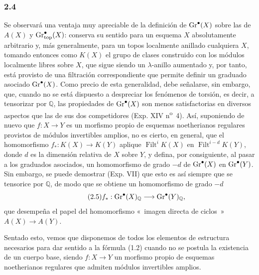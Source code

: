 \subsubsection*{2.4}
Se observará una ventaja muy apreciable de la definición de
$\operatorname{Gr}^\bullet(X)$ sobre las de $A(X)$ y
$\operatorname{Gr}^{\bullet}_{\mathrm{top}}(X)$: conserva su sentido para un esquema $X$
absolutamente arbitrario y, más generalmente, para un topos localmente
anillado cualquiera $X$, tomando entonces como $K(X)$ el grupo de clases
construido con los módulos localmente libres sobre $X$, que sigue siendo un
$\lambda$-anillo aumentado y, por tanto, está provisto de una filtración
correspondiente que permite definir un graduado asociado $\operatorname{Gr}^\bullet(X)$.
Como precio de esta generalidad, debe señalarse, sin embargo, que, cuando no
se está dispuesto a despreciar los fenómenos de torsión, es decir, a
tensorizar por $\mathbb Q$, las propiedades de $\operatorname{Gr}^\bullet(X)$ son menos
satisfactorias en diversos aspectos que las de sus dos competidores (Exp.
XIV n\textsuperscript{o}~4). Así, suponiendo de nuevo que $f:X\to Y$ es un
morfismo propio de esquemas noetherianos regulares provistos de módulos
invertibles amplios, no es cierto, en general, que el homomorfismo
$f_*:K(X)\longrightarrow K(Y)$ aplique $\operatorname{Filt}^i K(X)$ en
$\operatorname{Filt}^{i-d} K(Y)$, donde $d$ es la dimensión relativa de $X$
sobre $Y$, y defina, por consiguiente, al pasar a los graduados asociados, un
homomorfismo de grado $-d$ de $\operatorname{Gr}^\bullet(X)$ en $\operatorname{Gr}^\bullet(Y)$. Sin
embargo, se puede demostrar (Exp. VII) que esto es así siempre que se
tensorice por $\mathbb Q$, de modo que se obtiene un homomorfismo de grado
$-d$
\begin{equation}\tag{2.5}
f_*:\operatorname{Gr}^\bullet(X)_{\mathbb Q}\longrightarrow \operatorname{Gr}^\bullet(Y)_{\mathbb Q},
\end{equation}
que desempeña el papel del homomorfismo «~imagen directa de ciclos~»
$A(X)\to A(Y)$.

Sentado esto, vemos que disponemos de todos los elementos de estructura
necesarios para dar sentido a la fórmula (1.2) cuando no se postula la
existencia de un cuerpo base, siendo $f:X\to Y$ un morfismo propio de
esquemas noetherianos regulares que admiten módulos invertibles amplios.
